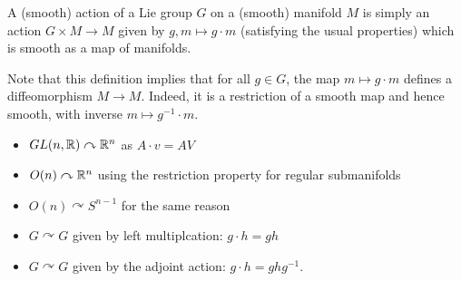 \documentclass{../mathnotes}
\def\acts{\curvearrowright}
\begin{document}
\begin{defn}
    A (smooth) action of a Lie group $G$ on a (smooth) manifold $M$ is simply an action $G\times M\to M$ given by $g,m\mapsto g\cdot m$
    (satisfying the usual properties) which is smooth as a map of manifolds.
\end{defn}

Note that this definition implies that for all $g\in G$, the map $m\mapsto g\cdot m$ defines a diffeomorphism $M\to M$. Indeed, it is a restriction
of a smooth map and hence smooth, with inverse $m\mapsto g^{-1}\cdot m$.

\begin{exmp}
    \begin{itemize}
        \item $GL(n,\R)\acts \R^n$ as $A\cdot v=AV$
        \item $O(n)\acts\R^n$ using the restriction property for regular submanifolds
        \item $O(n)\acts S^{n-1}$ for the same reason
        \item $G\acts G$ given by left multiplcation: $g\cdot h=gh$
        \item $G\acts G$ given by the adjoint action: $g\cdot h=ghg^{-1}$.
    \end{itemize}
\end{exmp}
\end{document}
